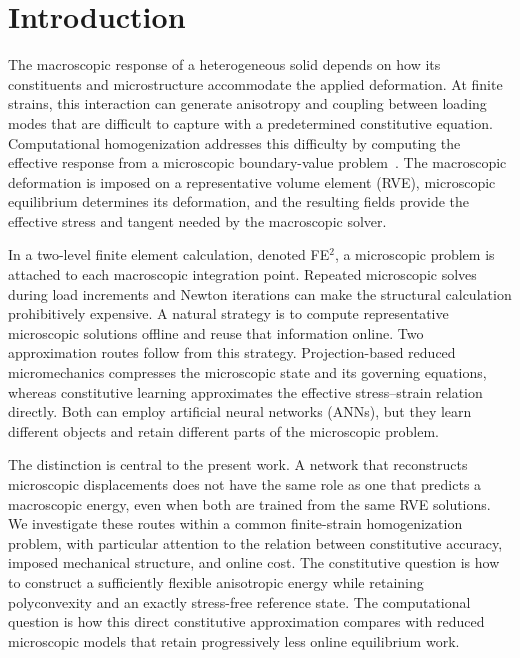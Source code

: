 \section{Introduction}
\label{sec:intro}
The macroscopic response of a heterogeneous solid depends on how its constituents and microstructure accommodate the applied deformation. At finite strains, this interaction can generate anisotropy and coupling between loading modes that are difficult to capture with a predetermined constitutive equation. Computational homogenization addresses this difficulty by computing the effective response from a microscopic boundary-value problem~\cite{Miehe1999}. The macroscopic deformation is imposed on a representative volume element (RVE), microscopic equilibrium determines its deformation, and the resulting fields provide the effective stress and tangent needed by the macroscopic solver.

In a two-level finite element calculation, denoted FE$^2$, a microscopic problem is attached to each macroscopic integration point. Repeated microscopic solves during load increments and Newton iterations can make the structural calculation prohibitively expensive. A natural strategy is to compute representative microscopic solutions offline and reuse that information online. Two approximation routes follow from this strategy. Projection-based reduced micromechanics compresses the microscopic state and its governing equations, whereas constitutive learning approximates the effective stress--strain relation directly. Both can employ artificial neural networks (ANNs), but they learn different objects and retain different parts of the microscopic problem.

The distinction is central to the present work. A network that reconstructs microscopic displacements does not have the same role as one that predicts a macroscopic energy, even when both are trained from the same RVE solutions. We investigate these routes within a common finite-strain homogenization problem, with particular attention to the relation between constitutive accuracy, imposed mechanical structure, and online cost. The constitutive question is how to construct a sufficiently flexible anisotropic energy while retaining polyconvexity and an exactly stress-free reference state. The computational question is how this direct constitutive approximation compares with reduced microscopic models that retain progressively less online equilibrium work.

